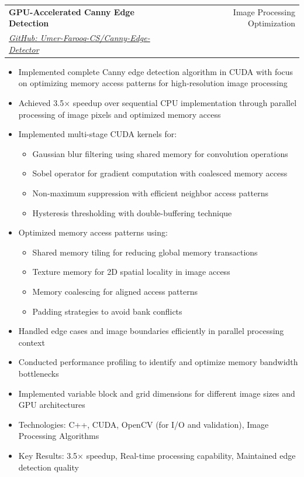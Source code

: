 \documentclass[a4paper,12pt]{article}
\makeatletter
\newenvironment{projectdetailed}[3]
    {
    \begin{tabularx}{\linewidth}{@{}l X r@{}}
    \textbf{#1} & \hfill & #2 \\
    \textit{#3} & & \\[3.75pt]
    \end{tabularx}
    \begin{minipage}[t]{\linewidth}
    \begin{itemize}[nosep,after=\strut, leftmargin=1em, itemsep=2pt,label=--]
    }
    {
    \end{itemize}
    \end{minipage}
    \vspace{6pt}
    }
\makeatother
\begin{document}
\begin{projectdetailed}{GPU-Accelerated Canny Edge Detection}{Image Processing Optimization}{\href{https://github.com/Umer-Farooq-CS/Canny-Edge-Detector}{GitHub: Umer-Farooq-CS/Canny-Edge-Detector}}
\item Implemented complete Canny edge detection algorithm in CUDA with focus on optimizing memory access patterns for high-resolution image processing
\item Achieved 3.5× speedup over sequential CPU implementation through parallel processing of image pixels and optimized memory access
\item Implemented multi-stage CUDA kernels for:
\begin{itemize}[nosep, leftmargin=2em]
    \item Gaussian blur filtering using shared memory for convolution operations
    \item Sobel operator for gradient computation with coalesced memory access
    \item Non-maximum suppression with efficient neighbor access patterns
    \item Hysteresis thresholding with double-buffering technique
\end{itemize}
\item Optimized memory access patterns using:
\begin{itemize}[nosep, leftmargin=2em]
    \item Shared memory tiling for reducing global memory transactions
    \item Texture memory for 2D spatial locality in image access
    \item Memory coalescing for aligned access patterns
    \item Padding strategies to avoid bank conflicts
\end{itemize}
\item Handled edge cases and image boundaries efficiently in parallel processing context
\item Conducted performance profiling to identify and optimize memory bandwidth bottlenecks
\item Implemented variable block and grid dimensions for different image sizes and GPU architectures
\item Technologies: C++, CUDA, OpenCV (for I/O and validation), Image Processing Algorithms
\item Key Results: 3.5× speedup, Real-time processing capability, Maintained edge detection quality
\end{projectdetailed}
\end{document}
